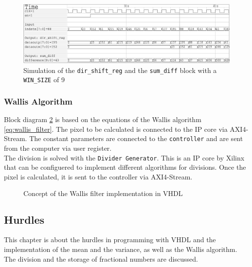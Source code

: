 \begin{figure}[tb!]
    \centering
    \includegraphics[width=\textwidth]
    {images/image_processing/dir_shift_sum_diff.png}
    \caption{Simulation of the \texttt{dir\_shift\_reg} and the
    \texttt{sum\_diff} block with a \texttt{WIN\_SIZE} of 9}
    \label{fig:sim_shift_sum}
\end{figure}


\subsubsection*{Wallis Algorithm}
Block diagram \ref{fig:wallis_vhdl} is based on the equations of the Wallis algorithm \ref{eq:wallis_filter}.
The pixel to be calculated is connected to the IP core via AXI4-Stream. The constant parameters are connected to the \texttt{controller} and are sent from the computer via user register. \\
The division is solved with the \texttt{Divider Generator}. This is an IP core
by Xilinx that can be configuered to implement different algorithms for
divisions. Once the pixel is calculated, it is sent to the controller via AXI4-Stream.

\begin{figure}[tb!]
    \centering
    \begin{adjustbox}{max width=\textwidth}
        
    \end{adjustbox}
    \caption{Concept of the Wallis filter implementation in VHDL}
    \label{fig:wallis_vhdl}
\end{figure}

\subsection{Hurdles} \label{ch:ip:hurdles_vhdl}
This chapter is about the hurdles in programming with VHDL and the implementation of the mean and the variance, as well as the Wallis algorithm.
The division and the storage of fractional numbers are discussed.

